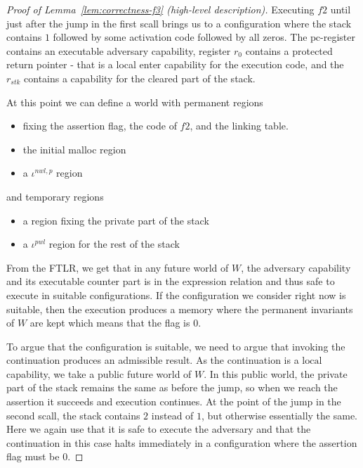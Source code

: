 \documentclass[a4paper]{article}
\newcommand{\var}[1]{\mathit{#1}}
\newcommand{\pcreg}{\mathrm{pc}}
\newcommand{\stk}{\var{stk}}
\newcommand{\nwl}{\var{nwl}}
\newcommand{\pwl}{\var{pwl}}
\newcommand{\plainperm}[1]{\mathrm{#1}}
\newcommand{\local}{\plainperm{local}}
\begin{document}
\begin{proof}[Proof of Lemma~\ref{lem:correctness-f3} (high-level description)]
Executing $f2$ until just after the jump in the first scall brings us to a configuration where the stack contains $1$ followed by some activation code followed by all zeros. The $\pcreg$-register contains an executable adversary capability, register $r_0$ contains a protected return pointer - that is a local enter capability for the execution code, and the $r_\stk$ contains a capability for the cleared part of the stack.

At this point we can define a world with permanent regions
\begin{itemize}
\item fixing the assertion flag, the code of $f2$, and the linking table.
\item the initial malloc region
\item a $\iota^{\nwl,p}$ region
\end{itemize}
and temporary regions
\begin{itemize}
\item a region fixing the private part of the stack
\item a $\iota^\pwl$ region for the rest of the stack 
\end{itemize}
From the FTLR, we get that in any future world of $W$, the adversary capability and its executable counter part is in the expression relation and thus safe to execute in suitable configurations. If the configuration we consider right now is suitable, then the execution produces a memory where the permanent invariants of $W$ are kept which means that the flag is $0$.

To argue that the configuration is suitable, we need to argue that invoking the continuation produces an admissible result. As the continuation is a $\local$ capability, we take a public future world of $W$. In this public world, the private part of the stack remains the same as before the jump, so when we reach the assertion it succeeds and execution continues. At the point of the jump in the second scall, the stack contains $2$ instead of $1$, but otherwise essentially the same. Here we again use that it is safe to execute the adversary and that the continuation in this case halts immediately in a configuration where the assertion flag must be $0$.
\end{proof}
\end{document}
